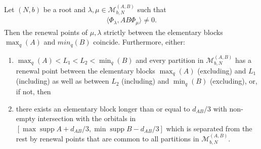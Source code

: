 \documentclass[10pt,a4paper]{amsart}
\DeclareMathOperator{\supp}{supp}
\begin{document}
\begin{lemma} \label{lm:partitions PsiAB}
	Let $(N,b) $ be a root and $\lambda, \mu\in \mathcal{M}_{b,N}^{(A,B)}$ such that 
	\begin{align*}
		\langle \Phi_\lambda, AB \Phi_\mu \rangle \neq 0.
	\end{align*}
	Then the renewal points of $\mu, \lambda$ strictly between the elementary blocks  $\max_q(A) $ and $ min_q(B) $ coincide.
	Furthermore, either:
	\begin{enumerate}
	\item $ \max_q(A)<  L_1 < L_2 <  \min_q(B) $ and every partition in $\mathcal{M}_{b,N}^{(A,B)}$ has a renewal point between the elementary blocks $\max_q(A)$ (excluding) and $ L_1$ (including) as well as  between $L_2$ (including) and $ \min_q(B)$ (excluding), or, if not, then
	\item there exists an elementary block longer than or equal to $ d_{AB} /3 $ with non-empty intersection with the orbitals in $ [ \max \supp A + d_{AB}/3 , \min \supp B - d_{AB}/3]$ which is separated from the rest by renewal points that are common to all partitions in $\mathcal{M}_{b,N}^{(A,B)}$.
	\end{enumerate}
\end{lemma}
\end{document}

